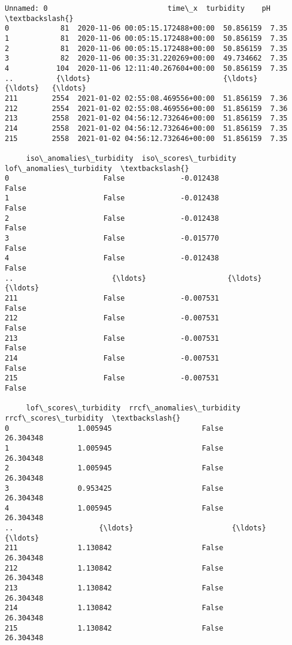             \begin{tcolorbox}[breakable, size=fbox, boxrule=.5pt, pad at break*=1mm, opacityfill=0]
\begin{Verbatim}[commandchars=\\\{\}]
     Unnamed: 0                            time\_x  turbidity    pH  \textbackslash{}
0            81  2020-11-06 00:05:15.172488+00:00  50.856159  7.35
1            81  2020-11-06 00:05:15.172488+00:00  50.856159  7.35
2            81  2020-11-06 00:05:15.172488+00:00  50.856159  7.35
3            82  2020-11-06 00:35:31.220269+00:00  49.734662  7.35
4           104  2020-11-06 12:11:40.267604+00:00  50.856159  7.35
..          {\ldots}                               {\ldots}        {\ldots}   {\ldots}
211        2554  2021-01-02 02:55:08.469556+00:00  51.856159  7.36
212        2554  2021-01-02 02:55:08.469556+00:00  51.856159  7.36
213        2558  2021-01-02 04:56:12.732646+00:00  51.856159  7.35
214        2558  2021-01-02 04:56:12.732646+00:00  51.856159  7.35
215        2558  2021-01-02 04:56:12.732646+00:00  51.856159  7.35

     iso\_anomalies\_turbidity  iso\_scores\_turbidity  lof\_anomalies\_turbidity  \textbackslash{}
0                      False             -0.012438                    False
1                      False             -0.012438                    False
2                      False             -0.012438                    False
3                      False             -0.015770                    False
4                      False             -0.012438                    False
..                       {\ldots}                   {\ldots}                      {\ldots}
211                    False             -0.007531                    False
212                    False             -0.007531                    False
213                    False             -0.007531                    False
214                    False             -0.007531                    False
215                    False             -0.007531                    False

     lof\_scores\_turbidity  rrcf\_anomalies\_turbidity  rrcf\_scores\_turbidity  \textbackslash{}
0                1.005945                     False              26.304348
1                1.005945                     False              26.304348
2                1.005945                     False              26.304348
3                0.953425                     False              26.304348
4                1.005945                     False              26.304348
..                    {\ldots}                       {\ldots}                    {\ldots}
211              1.130842                     False              26.304348
212              1.130842                     False              26.304348
213              1.130842                     False              26.304348
214              1.130842                     False              26.304348
215              1.130842                     False              26.304348


\end{Verbatim}
\end{tcolorbox}
